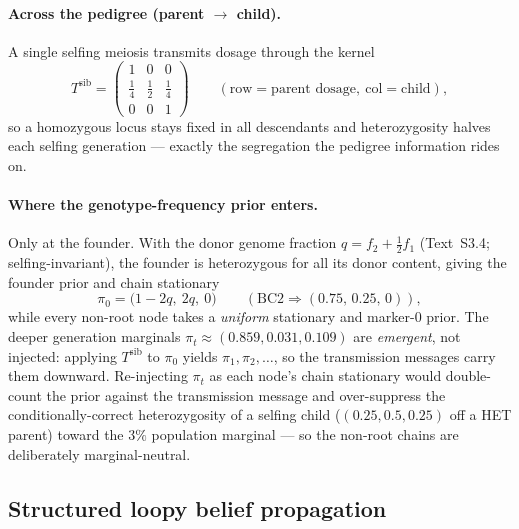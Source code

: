 \documentclass[11pt]{article}
\begin{document}
\paragraph{Across the pedigree (parent $\to$ child).} A single selfing meiosis
transmits dosage through the kernel
\begin{equation}
T^{\mathrm{sib}}=
\begin{pmatrix}
1 & 0 & 0\\
\tfrac14 & \tfrac12 & \tfrac14\\
0 & 0 & 1
\end{pmatrix}
\qquad (\text{row}=\text{parent dosage},\ \text{col}=\text{child}),
\label{eq:tsib}
\end{equation}
so a homozygous locus stays fixed in all descendants and heterozygosity halves each
selfing generation --- exactly the segregation the pedigree information rides on.

\paragraph{Where the genotype-frequency prior enters.} Only at the founder. With the
donor genome fraction $q=f_2+\tfrac12 f_1$ (Text~S3.4; selfing-invariant), the
founder is heterozygous for all its donor content, giving the founder prior and
chain stationary
\begin{equation}
\pi_0=\big(1-2q,\ 2q,\ 0\big)
\qquad(\text{BC2}\Rightarrow(0.75,\,0.25,\,0)),
\label{eq:founder-prior}
\end{equation}
while every non-root node takes a \emph{uniform} stationary and marker-0 prior. The
deeper generation marginals $\pi_t\approx(0.859,0.031,0.109)$ are \emph{emergent},
not injected: applying $T^{\mathrm{sib}}$ to $\pi_0$ yields $\pi_1,\pi_2,\dots$, so
the transmission messages carry them downward. Re-injecting $\pi_t$ as each node's
chain stationary would double-count the prior against the transmission message and
over-suppress the conditionally-correct heterozygosity of a selfing child
($(0.25,0.5,0.25)$ off a HET parent) toward the $3\%$ population marginal --- so the
non-root chains are deliberately marginal-neutral.

\subsection{Structured loopy belief propagation}
\label{sec:ped-bp}
\end{document}
